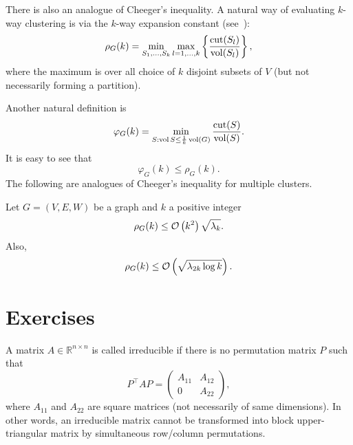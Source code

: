 There is also an analogue of Cheeger's inequality. A natural way of evaluating $k$-way clustering is via the $k$-way expansion constant (see~\cite{JRLee_SOGharan_LTrevisan_2011}):
\[
 \rho_G(k) = \min_{S_1,\dots,S_k} \max_{l=1,\dots,k} \left\{  \frac{\operatorname{cut}(S_l)}{\operatorname{vol}(S_l)}   \right\},
\]
where the maximum is over all choice of $k$ disjoint subsets of $V$ (but not necessarily forming a partition).

Another natural definition is
\[
 \varphi_G(k) = \min_{S: \operatorname{vol}{S}\leq \frac1k \operatorname{vol}(G)} \frac{\operatorname{cut}(S)}{\operatorname{vol}(S)}.
\]
It is easy to see that
\[
 \varphi_G(k) \leq \rho_G(k).
\]
The following are analogues of Cheeger's inequality for multiple clusters.

\begin{theorem}
Let $G=(V,E,W)$ be a graph and $k$ a positive integer
\begin{equation}\label{eq:3:multywaycheeger:k2}
 \rho_G(k) \leq \mathcal{O}\left(k^2\right) \sqrt{\lambda_k}.
\end{equation}
Also,
\[
 \rho_G(k) \leq \mathcal{O}\left(\sqrt{\lambda_{2k} \log k} \right).
\]
\end{theorem}





\section*{Exercises}

\begin{definition}
    A matrix $A \in \mathbb{R}^{n \times n}$ is called irreducible if there is no permutation matrix $P$ such that
    \begin{equation*}
        P^\top A P = \begin{pmatrix} A_{11} & A_{12} \\ 0 & A_{22} \end{pmatrix},
    \end{equation*}
    where $A_{11}$ and $A_{22}$ are square matrices (not necessarily of same dimensions). In other words, an irreducible matrix cannot be transformed into block upper-triangular matrix by simultaneous row/column permutations.
\end{definition}

